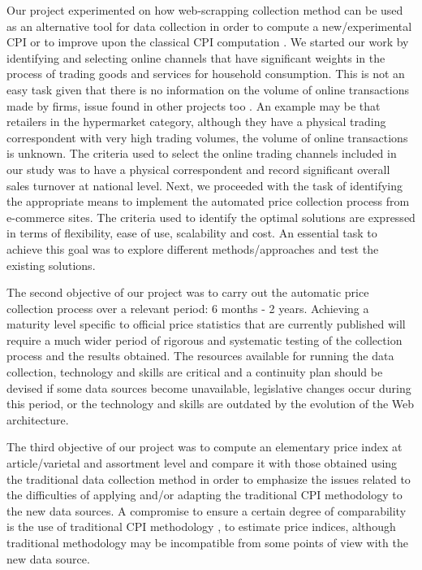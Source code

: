 \documentclass[]{article}
\begin{document}
Our project experimented on how web-scrapping collection method can be used as an alternative tool for data collection in order to compute a new/experimental CPI or to improve upon the classical CPI computation \cite{otawa2017}. We started our work by identifying and 
selecting online channels that have significant weights in the process of trading goods and services for household consumption. 
This is not an easy task given that there is no information on the volume of online transactions made by firms, 
issue found in other projects too \cite{willenborg2017}. 
An example may be that retailers in the hypermarket category, although they have a physical trading correspondent with very high 
trading volumes, the volume of online transactions is unknown. The criteria used to select the online trading channels included in 
our study was to have a physical correspondent and record significant overall sales turnover at national level. Next, we proceeded with the 
task of identifying the appropriate means to implement the automated price collection process from e-commerce sites. The criteria 
used to identify the optimal solutions are expressed in terms of flexibility, ease of use, scalability and cost. An essential task 
to achieve this goal was to explore different methods/approaches and test the existing solutions. 


The second objective of our project was to carry out the automatic price collection process over a relevant period: 6 months - 2 years. 
Achieving a maturity level specific to official price statistics that are currently published will require a much wider period of 
rigorous and systematic testing of the collection process and the results obtained. The resources available for running the data 
collection, technology and skills are critical and a continuity plan should be devised if some data sources become unavailable, 
legislative changes occur during this period, or the technology and skills are outdated by the evolution of the Web architecture. 


The third objective of our project was to compute an elementary price index at article/varietal and assortment level and compare 
it with those obtained using the traditional data collection method in order to emphasize the issues related to the difficulties 
of applying and/or adapting the traditional CPI methodology \cite{cpi} to the new data sources.  A compromise to 
ensure a certain degree of comparability is the use of traditional CPI methodology \cite{cpi2}, \cite{cpi3} to estimate price indices, although 
traditional methodology may be incompatible from some points of view with the new data source. 
\end{document}
